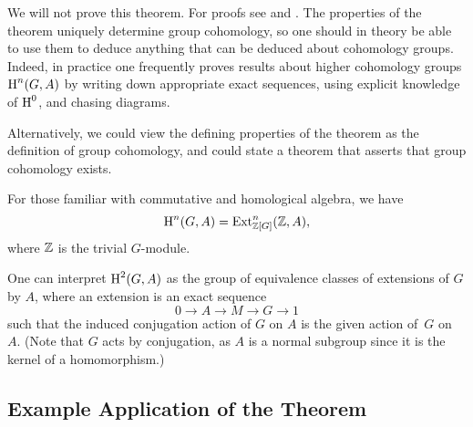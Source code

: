 We will not prove this theorem.  For proofs see
\cite[Atiyah-Wall]{cassels-frohlich} and
\cite[Ch.~7]{serre:localfields}. The properties of the theorem
uniquely determine group cohomology, so one should in theory be able
to use them to deduce anything that can be deduced about cohomology
groups.  Indeed, in practice one frequently proves results about
higher cohomology groups $\operatorname{H}^n(G,A)$ by writing down appropriate exact
sequences, using explicit knowledge of $\operatorname{H}^0$, and chasing diagrams.

\begin{remark}
	Alternatively, we could view the defining properties of the theorem
	as the definition of group cohomology, and could state a theorem
	that asserts that group cohomology exists.
\end{remark}

\begin{remark}
	For those familiar with commutative and homological algebra, we have
	$$
		\operatorname{H}^n(G,A) = \operatorname{Ext}^n_{\mathbb{Z}[G]}(\mathbb{Z}, A),
	$$
	where $\mathbb{Z}$ is the trivial $G$-module.
\end{remark}

\begin{remark}
	One can interpret $\operatorname{H}^2(G,A)$ as the group of equivalence classes of
	extensions of $G$ by $A$, where an extension is an exact sequence
	$$0\to A \to M \to G \to 1$$ such that the induced conjugation action
	of $G$ on $A$ is the given action of~$G$ on~$A$.
	(Note that $G$ acts by conjugation, as $A$ is a normal
	subgroup since it is the kernel of a homomorphism.)
\end{remark}

\subsection{Example Application of the Theorem}


